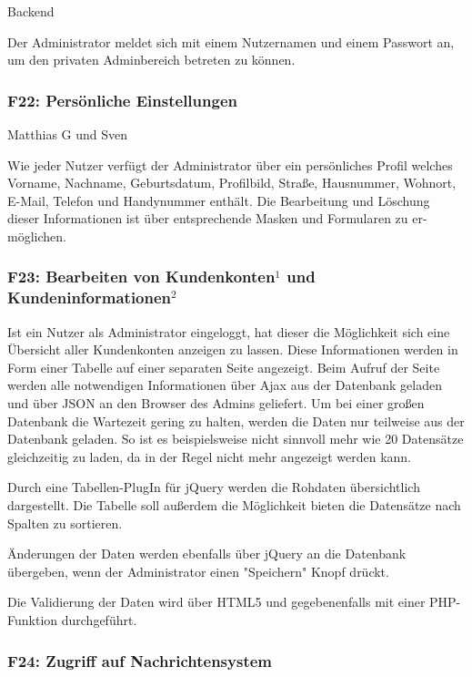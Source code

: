 \documentclass[10pt,a4paper]{scrartcl}
\begin{document}
Backend

Der Administrator meldet sich mit einem Nutzernamen und einem Passwort an, um den privaten Adminbereich betreten zu können.

\subsubsection*{F22: Persönliche Einstellungen}

Matthias G und Sven

Wie jeder Nutzer verfügt der Administrator über ein persönliches Profil welches Vorname, Nachname, Geburtsdatum, Profilbild, Straße, Hausnummer, Wohnort, E-Mail, Telefon und Handynummer enthält. Die Bearbeitung und Löschung dieser Informationen ist über entsprechende Masken und Formularen zu er-möglichen.

\subsubsection*{F23: Bearbeiten von Kundenkonten$^1$ und Kundeninformationen$^2$}

Ist ein Nutzer als Administrator eingeloggt, hat dieser die Möglichkeit sich eine Übersicht
aller Kundenkonten anzeigen zu lassen. Diese Informationen werden in Form einer Tabelle auf 
einer separaten Seite angezeigt. Beim Aufruf der Seite werden alle notwendigen Informationen 
über Ajax aus der Datenbank geladen und über JSON an den Browser des Admins geliefert. Um
bei einer großen Datenbank die Wartezeit gering zu halten, werden die Daten nur teilweise
aus der Datenbank geladen. So ist es beispielsweise nicht sinnvoll mehr wie 20 Datensätze 
gleichzeitig zu laden, da in der Regel nicht mehr angezeigt werden kann.

Durch eine Tabellen-PlugIn für jQuery werden die Rohdaten übersichtlich dargestellt.
Die Tabelle soll außerdem die Möglichkeit bieten die Datensätze nach Spalten zu sortieren.

Änderungen der Daten werden ebenfalls über jQuery an die Datenbank übergeben, wenn der Administrator
einen "Speichern" Knopf drückt.

Die Validierung der Daten wird über HTML5 und gegebenenfalls mit einer PHP-Funktion durchgeführt.

\subsubsection*{F24: Zugriff auf Nachrichtensystem}
\end{document}
